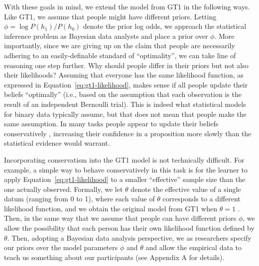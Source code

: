 \documentclass[doc,floatsintext]{apa6}
\begin{document}
With these goals in mind, we extend the model from GT1 in the following ways. Like GT1, we assume that people might have different priors. Letting $\phi = \log P(h_1)/P(h_0)$ denote the prior log odds, we approach the statistical inference problem as Bayesian data analysts and place a prior over $\phi$. More importantly, since we are giving up on the claim that people are necessarily adhering to an easily-definable standard of ``optimality'', we can take line of reasoning one step further. Why should people differ in their priors but not also their likelihoods? Assuming that everyone has the same likelihood function, as expressed in Equation~\ref{eq:gt1-likelihood}, makes sense if all people update their beliefs ``optimally'' (i.e., based on the assumption that each observation is the result of an independent Bernoulli trial). This is indeed what statistical models for binary data typically assume, but that does not mean that people make the same assumption. In many tasks people appear to update their beliefs conservatively \cite{phillips_conservatism_1966}, increasing their confidence in a proposition more slowly than the statistical evidence would warrant.

Incorporating conservatism into the GT1 model is not technically difficult. For example, a simple way to behave conservatively in this task is for the learner to apply Equation~\ref{eq:gt1-likelihood} to a smaller ``effective'' sample size than the one actually observed. Formally, we let $\theta$ denote the effective value of a single datum (ranging from 0 to 1), where each value of $\theta$ corresponds to a different likelihood function, and we obtain the original model from GT1 when $\theta=1$ \cite<see also>{navarro2012,RansomINPRESS}. Then, in the same way that we assume that people can have different priors $\phi$, we allow the possibility that each person has their own likelihood function defined by $\theta$. Then, adopting a Bayesian data analysis perspective, we as researchers specify our priors over the model parameters $\phi$ and $\theta$ and allow the empirical data to teach us something about our participants (see Appendix A for details).
\end{document}
